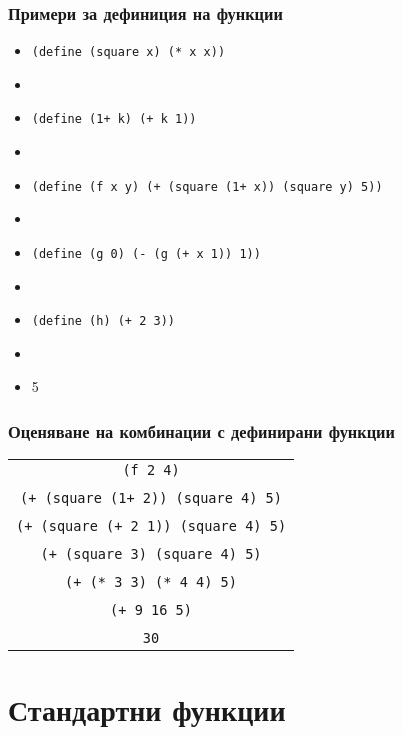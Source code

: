\documentclass{beamer}
\begin{document}
\begin{frame}
  \frametitle{Примери за дефиниция на функции}

  \begin{itemize}[<+->]
  \item \tt{(define (square x) (* x x))}
  \item {}
  \item \tt{(define (1+ k) (+ k 1))}
  \item {}
  \item \tt{(define (f x y) (+ (square (1+ x)) (square y) 5))}
  \item {}
  \item \tt{(define (g 0) (- (g (+ x 1)) 1))}
  \item {}
  \item \tt{(define (h) (+ 2 3))}
  \item {}
  \item {}5
  \end{itemize}

\end{frame}

\begin{frame}
  \frametitle{Оценяване на комбинации с дефинирани функции}
  \begin{center}
    \begin{tabular}{c}
      \tt{(f 2 4)}\\
      \pause\nxt{\bda\\
      \tt{(+ (square (1+ 2)) (square 4) 5)}\\
      \nxt{\bda\\
      \tt{(+ (square (+ 2 1)) (square 4) 5)}\\
      \nxt{\bda\\
      \tt{(+ (square 3) (square 4) 5)}\\
      \nxt{\bda\\
      \tt{(+ (* 3 3) (* 4 4) 5)}\\
      \nxt{\bda\\
      \tt{(+ 9 16 5)}\\
      \nxt{\bda\\
      \tt{30}}}}}}}
    \end{tabular}
  \end{center}
\end{frame}

\section{Стандартни функции}
\end{document}
